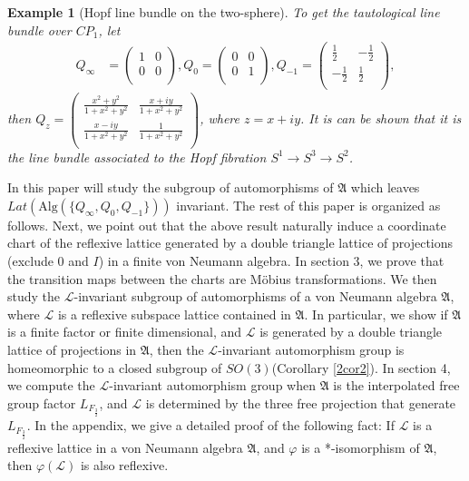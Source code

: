 \documentclass{amsart}
\newcommand{\AAA}{\mathfrak A}
\newcommand{\LLL}{\mathcal L} %
\newcommand{\Alg}{\mathrm{Alg}}
\newtheorem{example}{Example}[section]
\begin{document}
\begin{example}[Hopf line bundle on the two-sphere]
To get the tautological line bundle over $CP_{1}$, let
\begin{align*}
Q_{\infty}&= \left(
        \begin{array}{cc}
          1 & 0 \\
          0 & 0 \\
        \end{array}
      \right),
Q_{0}= \left(
        \begin{array}{cc}
          0 & 0 \\
          0 & 1 \\
        \end{array}
      \right),
Q_{-1}= \left(
        \begin{array}{cc}
          \frac{1}{2} & -\frac{1}{2} \\
          -\frac{1}{2} & \frac{1}{2} \\
        \end{array}
      \right),
\end{align*}
then $Q_{z} = \left(
        \begin{array}{cc}
          \frac{x^2 + y^2}{1+x^2 + y^2 } & \frac{x + iy}{1+ x^2 + y^2} \\
          \frac{x - iy}{1+ x^2 + y^2} & \frac{1}{1+ x^2 + y^2}\\
        \end{array}
      \right)$, where $z = x+ iy$. It is can be shown that it is the line bundle associated to the Hopf fibration $S^{1} \rightarrow S^{3} \rightarrow S^{2}$.
\end{example}

In this paper will study the subgroup of automorphisms of $\AAA$ which leaves $Lat(\Alg(\{Q_{\infty}, Q_{0}, Q_{-1}\}))$ invariant.
The rest of this paper is organized as follows.  
Next, we point out that the above result naturally induce a coordinate chart of 
the reflexive lattice generated by a double triangle lattice of projections (exclude $0$ and $I$) in a finite von Neumann algebra.
In section 3, we prove that the transition maps between the charts are  M\"{o}bius transformations.
We then study the $\LLL$-invariant subgroup of automorphisms of  a von Neumann algebra $\AAA$, where $\LLL$ is a
reflexive subspace lattice contained in $\AAA$. In particular, we show if $\AAA$ is a finite factor or finite dimensional, and $\LLL$
is generated by a double triangle lattice of projections in $\AAA$, then the $\LLL$-invariant automorphism group is homeomorphic to a closed 
subgroup of $SO(3)$(Corollary \ref{2cor2}). In section 4, we compute the $\LLL$-invariant automorphism group when $\AAA $ 
is the interpolated free group factor $L_{F_{\frac{3}{2}}}$, and $\LLL$ is determined by the three free projection that generate $L_{F_{\frac{3}{2}}}$. 
In the appendix, we give a detailed proof of the following fact: If $\LLL$ is a reflexive lattice in a von Neumann algebra $\AAA$, and $\varphi$ is a *-isomorphism of 
$\AAA$, then $\varphi(\LLL)$ is also reflexive.\newline
\end{document}
